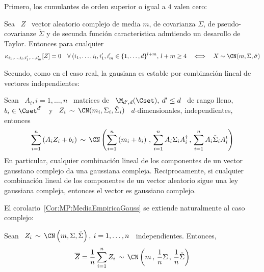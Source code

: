 
Primero, los cumulantes de orden superior o igual a $4$ valen cero:
%
\begin{lema}
%
  Sea \ $Z$ \ vector aleatorio complejo de media $m$, de covarianza $\Sigma$, de
  pseudo-covarianze  $\check{\Sigma}$ y  de  secunda funci\'on  caracter\'istica
  admtiendo un desarollo de Taylor. Entonces para cualquier
  \[
  \kappa_{i_1,\ldots,i_l,i'_1,\ldots,i'_m}[Z] = 0 \quad \forall \: ( i_1, \ldots
  , i_l  , i'_1  , i'_m  \in \{  1 , \ldots  , d  \}^{l+m}, \,  l+m \ge  4 \quad
  \Longleftrightarrow \quad X \sim \CN(m,\Sigma,\check{\sigma})
  \]
\end{lema}
%

Secundo, como en  el caso real, la gausiana es  estable por combinaci\'on lineal
de vectores independientes:
%
\begin{teorema}[Stabilidad]
\label{Teo:MP:StabilidadGaussianaCompleja}
%
  Sean \ $A_i , i = 1,\ldots,n$  \ matrices de \ $\M_{d',d}(\Cset), \: d' \le d$
  \  de   rango  lleno,   $b_i  \in  \Cset^{d'}$   \  y   \  $Z_i  \,   \sim  \,
  \CN(m_i,\Sigma_i,\check{\Sigma}_i)$   \   $d$-dimensionales,  independientes,
  entonces
  \[
  \sum_{i=1}^n \left( A_i  Z_i + b_i \right) \,  \sim \, \CN\left( \sum_{i=1}^n
    \left( m_i + b_i \right) \, ,  \, \sum_{i=1}^n A_i \Sigma_i A_i^\dag \, , \,
    \sum_{i=1}^n A_i \check{\Sigma}_i A_i^t \right)
  \]
  En particular, cualquier combinaci\'on lineal  de los componentes de un vector
  gaussiano complejo  da una  gaussiana compleja.  Reciprocamente,  si cualquier
  combinaci\'on lineal de  los componentes de un vector  aleatorio sigue una ley
  gaussiana compleja, entonces el vector es gaussiano complejo.
\end{teorema}
%
El corolario~\ref{Cor:MP:MediaEmpiricaGauss} se extiende naturalmente al caso complejo:
%
\begin{corolario}\label{Cor:MP:MediaEmpiricaGaussCompleja}
%
  Sean \ $Z_i \, \sim \, \CN\left(  m , \Sigma , \check{\Sigma} \right), \: i =
  1, \ldots , n$ \ independientes. Entonces,
  \[
  \overline{Z} =  \frac{1}{n} \sum_{i=1}^n Z_i \,  \sim \, \CN\left( m  \, , \,
    \frac{1}{n} \Sigma \, , \, \frac{1}{n} \check{\Sigma} \right)
  \]
\end{corolario}

